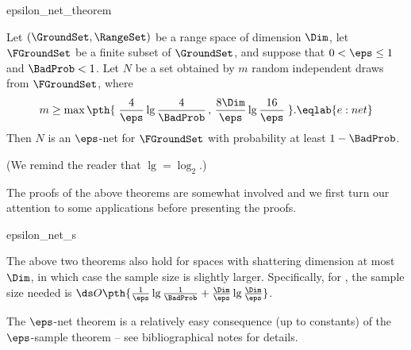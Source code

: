 
\begin{fragment}{epsilon_net_theorem}
    \begin{theorem}
        Let $(\GroundSet,\RangeSet)$ be a range space of \VC dimension
        $\Dim$, let $\FGroundSet$ be a finite subset of $\GroundSet$,
        and suppose that $0 < \eps \leq 1$ and $\BadProb < 1$. Let $N$
        be a set obtained by $m$ random independent draws from
        $\FGroundSet$, where
        \begin{equation}
            m \geq \max\pth{\;
               \frac{4}{\eps} \lg \frac{4}{\BadProb} \,,\,
               \frac{8\Dim}{\eps}\lg \frac{16}{\eps} \;}.
            \eqlab{e:net}
        \end{equation}
        Then $N$ is an $\eps$-net for $\FGroundSet$ with probability
        at least $1-\BadProb$.
    \end{theorem}
\end{fragment}

(We remind the reader that $\lg=\log_2$.)


The proofs of the above theorems are somewhat involved and we first
turn our attention to some applications before presenting the proofs.

\begin{fragment}{epsilon_net_s}
    \begin{remark}
        The above two theorems also hold for spaces with shattering
        dimension at most $\Dim$, in which case the sample size is
        slightly larger.  Specifically, for , the
        sample size needed is $\ds O\pth{ \frac{1}{\eps} \lg
           \frac{1}{\BadProb} + \frac{\Dim}{\eps}\lg \frac{\Dim}{\eps}
        }$.        
    \end{remark}
\end{fragment}

\begin{remark}
    The $\eps$-net theorem is a relatively easy consequence (up to
    constants) of the $\eps$-sample theorem -- see bibliographical
    notes for details.
\end{remark}

